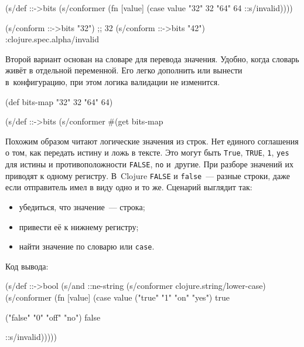 \else

\begin{english}
  \begin{clojure}
(s/def ::->bits
  (s/conformer
   (fn [value]
     (case value
       "32" 32 "64" 64
       ::s/invalid))))

(s/conform ::->bits "32") ;; 32
(s/conform ::->bits "42") :clojure.spec.alpha/invalid
  \end{clojure}
\end{english}

\fi


Второй вариант основан на словаре для перевода значения. Удобно, когда словарь
живёт в отдельной переменной. Его легко дополнить или вынести в~конфигурацию,
при этом логика валидации не изменится.

\begin{english}
  \begin{clojure}
(def bits-map {"32" 32 "64" 64})

(s/def ::->bits
  (s/conformer
   #(get bits-map %
  \end{clojure}
\end{english}

Похожим образом читают логические значения из строк. Нет единого соглашения о
том, как передать истину и ложь в тексте. Это могут быть \verb|True|,
\verb|TRUE|, \verb|1|, \verb|yes| для истины и противоположности \verb|FALSE|,
\verb|no| и~другие. При разборе значений их приводят к одному
регистру. В~Clojure \verb|FALSE| и \verb|false|~--- разные строки, даже если
отправитель имел в виду одно и то же. Сценарий выглядит так:

\begin{itemize}

\item
  убедиться, что значение~--- строка;

\item
  привести её к нижнему регистру;

\item
  найти значение по словарю или \verb|case|.

\end{itemize}

\noindent
Код вывода:

\ifx\DEVICETYPE\MOBILE

\begin{english}
  \begin{clojure}
(s/def ::->bool
  (s/and
   ::ne-string
   (s/conformer
     clojure.string/lower-case)
   (s/conformer
    (fn [value]
      (case value
        ("true" "1" "on" "yes")
        true

        ("false" "0" "off" "no")
        false

        ::s/invalid)))))

  \end{clojure}
\end{english}

